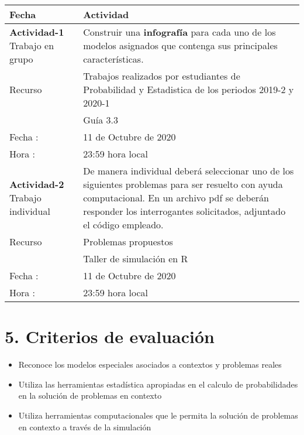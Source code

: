 \documentclass[base=hide,11pt]{elegantbook}
\begin{document}
\begin{tabular}{p{4cm}p{10cm}}
\hline	
Fecha                   & Actividad	\\
\hline 	
{\bf Actividad-1}  \hspace{4cm} Trabajo  en grupo      &  Construir una {\bf infografía} para cada uno de los modelos asignados que contenga sus principales características.\\
Recurso                 &  Trabajos realizados por estudiantes de Probabilidad y Estadistica de los periodos 2019-2 y 2020-1\\
                        & Guía 3.3 \\
Fecha  : & 11 de Octubre de 2020\\
Hora   : & 23:59 hora local \\
\hline 
{\bf Actividad-2}  \hspace{4cm} Trabajo individual  & De manera individual deberá seleccionar uno de los siguientes problemas para ser resuelto con ayuda computacional. En un archivo pdf se deberán responder los interrogantes solicitados, adjuntado el código empleado.\\
Recurso            & Problemas propuestos\\
				   & Taller de simulación en R	\\
Fecha  : & 11 de Octubre de 2020\\
Hora   : & 23:59 hora local \\
\hline 

\hline 
\end{tabular}
\section*{5. Criterios de evaluación}

\begin{itemize}
	\item Reconoce los modelos especiales asociados a contextos  y problemas reales
	\item Utiliza las herramientas estadística apropiadas en el calculo de probabilidades en la solución de problemas en contexto
	\item Utiliza herramientas computacionales que le permita  la solución de problemas en contexto a través de la simulación
\end{itemize}
\end{document}

